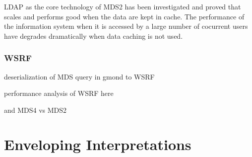 LDAP as the core technology of MDS2 has been investigated \cite{zhang2004performance} and proved that scales and performs good when the data are kept in cache. The performance of the information system when it is accessed by a large number of cocurrent users have degrades dramatically when data caching is not used.

\subsubsection{WSRF}
deserialization of MDS query in gmond to WSRF

performance analysis of WSRF here \cite{schopf2006monitoring}

and MDS4 vs MDS2

\section{Enveloping Interpretations}

